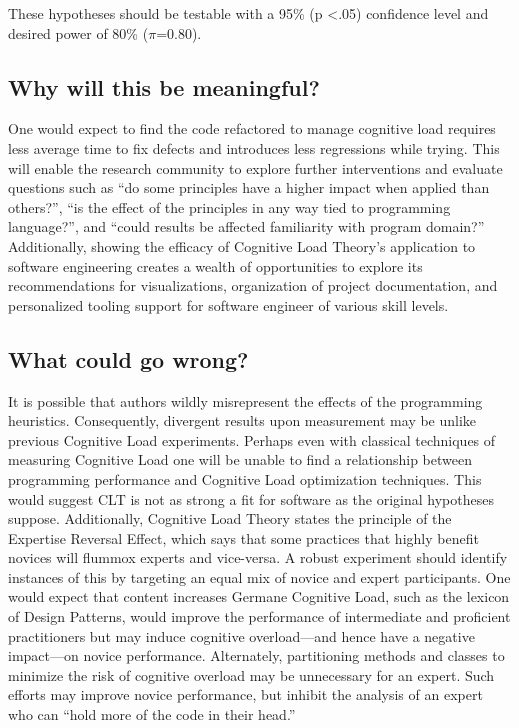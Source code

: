 These hypotheses should be testable with a 95\% (p \textless .05) confidence level and desired power of 80\% ($\pi$=0.80).

\subsection{Why will this be meaningful?}

One would expect to find the code refactored to manage cognitive load requires less average time to fix defects and introduces less regressions while trying. This will enable the research community to explore further interventions and evaluate questions such as “do some principles have a higher impact when applied than others?”, “is the effect of the principles in any way tied to programming language?”, and “could results be affected familiarity with program domain?” Additionally, showing the efficacy of Cognitive Load Theory’s application to software engineering creates a wealth of opportunities to explore its recommendations for visualizations, organization of project documentation, and personalized tooling support for software engineer of various skill levels.

\subsection{What could go wrong?}

It is possible that authors wildly misrepresent the effects of the programming heuristics. Consequently, divergent results upon measurement may be unlike previous Cognitive Load experiments. Perhaps even with classical techniques of measuring Cognitive Load one will be unable to find a relationship between programming performance and Cognitive Load optimization techniques. This would suggest CLT is not as strong a fit for software as the original hypotheses suppose.  Additionally, Cognitive Load Theory states the principle of the Expertise Reversal Effect, which says that some practices that highly benefit novices will flummox experts and vice-versa. A robust experiment should identify instances of this by targeting an equal mix of novice and expert participants. One would expect that content increases Germane Cognitive Load, such as the lexicon of Design Patterns, would improve the performance of intermediate and proficient practitioners but may induce cognitive overload—and hence have a negative impact—on novice performance. Alternately, partitioning methods and classes to minimize the risk of cognitive overload may be unnecessary for an expert. Such efforts may improve novice performance, but inhibit the analysis of an expert who can “hold more of the code in their head.”  

